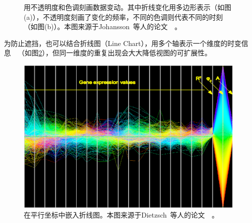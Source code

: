 \documentclass[12pt,twocolumn]{article}
\begin{document}
\begin{figure}[!htb]
\centering
{}
\caption{\label{fig:PC_Data_Time3}用不透明度和色调刻画数据变动。其中折线变化用多边形表示（如图(a)），不透明度刻画了变化的频率，不同的色调则代表不同的时刻（如图(b)）。本图来源于Johansson~等人的论文~\citep{johansson2007depth}~。}
\end{figure}

为防止遮挡，也可以结合折线图（Line Chart），用多个轴表示一个维度的时变信息~\citep{edsall2003parallel}~\citep{dietzsch2009spray}（如图\ref{fig:PC_Data_Time1}），但同一维度的重复出现会大大降低视图的可扩展性。

\begin{figure}[!htb]
\centering
\includegraphics[width=0.9\linewidth]{images/PC_Data_Time1.eps}
\caption{\label{fig:PC_Data_Time1}在平行坐标中嵌入折线图。本图来源于Dietzsch~等人的论文~\citep{dietzsch2009spray}~。
}
\end{figure}
\end{document}
